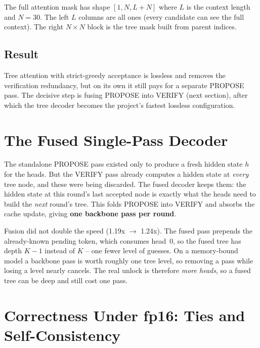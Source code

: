 \documentclass[12pt, a4paper]{article}
\begin{document}
The full attention mask has shape $[1, N, L + N]$ where $L$ is the context length
and $N = 30$. The left $L$ columns are all ones (every candidate can see the full
context). The right $N \times N$ block is the tree mask built from parent indices.

\subsection{Result}

Tree attention with strict-greedy acceptance is lossless and removes the verification
redundancy, but on its own it still pays for a separate PROPOSE pass. The decisive step is
fusing PROPOSE into VERIFY (next section), after which the tree decoder becomes the
project's fastest lossless configuration.

\section{The Fused Single-Pass Decoder}

The standalone PROPOSE pass existed only to produce a fresh hidden state $h$ for the heads.
But the VERIFY pass already computes a hidden state at \emph{every} tree node, and these were
being discarded. The fused decoder keeps them: the hidden state at this round's last accepted
node is exactly what the heads need to build the \emph{next} round's tree. This folds PROPOSE
into VERIFY and absorbs the cache update, giving \textbf{one backbone pass per round}.

Fusion did not double the speed (1.19x $\to$ 1.24x). The fused pass prepends the already-known
pending token, which consumes head~0, so the fused tree has depth $K-1$ instead of $K$ -- one
fewer level of guesses. On a memory-bound model a backbone pass is worth roughly one tree
level, so removing a pass while losing a level nearly cancels. The real unlock is therefore
\emph{more heads}, so a fused tree can be deep and still cost one pass.

\section{Correctness Under fp16: Ties and Self-Consistency}
\end{document}
